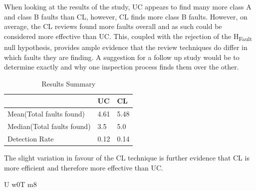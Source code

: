 \documentclass[10pt,twocolumn]{article}
\begin{document}
When looking at the results of the study, UC appears to find many more class A and class B faults than CL, however, CL finds more class B faults. However, on average, the CL reviews found more faults overall and as such could be considered more effective than UC. This, coupled with the rejection of the H\textsubscript{Fault} null hypothesis, provides ample evidence that the review techniques do differ in which faults they are finding. A suggestion for a follow up study would be to determine exactly  and why one inspection process finds them over the other.

\begin{table}
	\centering
	\begin{tabular}[ht]{|l|l|l|}
	\hline
	& UC & CL \\
	\hline
	Mean(Total faults found) & 4.61 & 5.48 \\
	\hline
	Median(Total faults found) & 3.5 & 5.0 \\
	\hline
	Detection Rate & 0.12 & 0.14 \\
	\hline
	\end{tabular}
	\caption{Results Summary}
\end{table}





The slight variation in favour of the CL technique is further evidence that CL is more efficient and therefore more effective than UC.








U w0T m8
\end{document}
